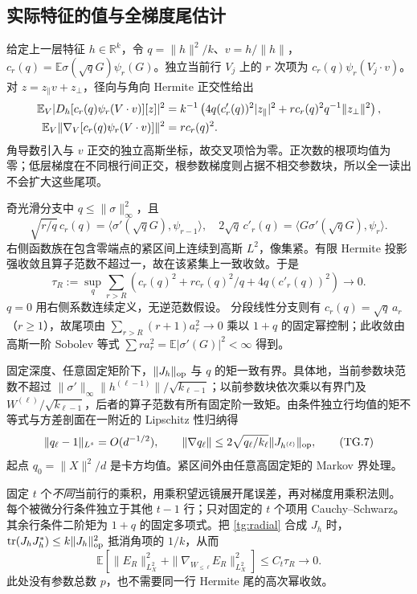 \documentclass[a4paper]{tufte-handout}
\begin{document}
\begin{fullwidth}
\subsection{实际特征的值与全梯度尾估计}
给定上一层特征 $h\in\mathbb R^k$，令 $q=\|h\|^2/k$、$v=h/\|h\|$，
$c_r(q)=\mathbb E\sigma(\sqrt qG)\psi_r(G)$。独立当前行 $V_j$ 上的 $r$ 次项为 $c_r(q)\psi_r(V_j\cdot v)$。对 $z=z_\parallel v+z_\perp$，径向与角向 Hermite 正交性给出
\begin{align}
 \mathbb E_V|D_h[c_r(q)\psi_r(V\cdot v)][z]|^2
 &=k^{-1}\left(4q(c'_r(q))^2|z_\parallel|^2+
              r c_r(q)^2q^{-1}\|z_\perp\|^2\right),\label{tg:radial}\\
 \mathbb E_V\|\nabla_V[c_r(q)\psi_r(V\cdot v)]\|^2&=r c_r(q)^2.\notag
\end{align}
角导数引入与 $v$ 正交的独立高斯坐标，故交叉项恰为零。正次数的根项均值为零；低层梯度在不同根行间正交，根参数梯度则占据不相交参数块，所以全一读出不会扩大这些尾项。

奇光滑分支中 $q\le\|\sigma\|_\infty^2$，且
\[
 \sqrt{r/q}\,c_r(q)=\langle\sigma'(\sqrt qG),\psi_{r-1}\rangle,\quad
 2\sqrt q\,c'_r(q)=\langle G\sigma'(\sqrt qG),\psi_r\rangle.
\]
右侧函数族在包含零端点的紧区间上连续到高斯 $L^2$，像集紧。有限 Hermite 投影强收敛且算子范数不超过一，故在该紧集上一致收敛。于是
\[
 \tau_R:=\sup_q\sum_{r>R}\left(c_r(q)^2+r c_r(q)^2/q+4q(c'_r(q))^2\right)\longrightarrow0.
 \tag{TG.6}
\]
$q=0$ 用右侧系数连续定义，无逆范数假设。
分段线性分支则有 $c_r(q)=\sqrt q\,a_r$（$r\ge1$），故尾项由
$\sum_{r>R}(r+1)a_r^2\to0$ 乘以 $1+q$ 的固定幂控制；此收敛由高斯一阶 Sobolev 等式 $\sum r a_r^2=\mathbb E|\sigma'(G)|^2<\infty$ 得到。

固定深度、任意固定矩阶下，$\|J_h\|_{\rm op}$ 与 $q$ 的矩一致有界。具体地，当前参数块范数不超过 $\|\sigma'\|_\infty\|h^{(\ell-1)}\|/\sqrt{k_{\ell-1}}$；以前参数块依次乘以有界门及 $W^{(\ell)}/\sqrt{k_{\ell-1}}$，后者的算子范数有所有固定阶一致矩。由条件独立行均值的矩不等式与方差剖面在一附近的 Lipschitz 性归纳得
\[
 \|q_\ell-1\|_{L^s}=O(d^{-1/2}),\qquad
 \|\nabla q_\ell\|\le2\sqrt{q_\ell/k_\ell}\|J_{h^{(\ell)}}\|_{\rm op},
 \tag{TG.7}
\]
起点 $q_0=\|X\|^2/d$ 是卡方均值。紧区间外由任意高固定矩的 Markov 界处理。

固定 $t$ 个\emph{不同}当前行的乘积，用乘积望远镜展开尾误差，再对梯度用乘积法则。每个被微分行条件独立于其他 $t-1$ 行；只对固定的 $t$ 个项用 Cauchy--Schwarz。其余行条件二阶矩为 $1+q$ 的固定多项式。把 \eqref{tg:radial} 合成 $J_h$ 时，
$\operatorname{tr}(J_hJ_h^*)\le k\|J_h\|_{\rm op}^2$ 抵消角项的 $1/k$，从而
\begin{equation}\label{tg:product-tail}
 \mathbb E\left[\|E_R\|_{L_X^2}^2+
 \|\nabla_{W_{\le\ell}}E_R\|_{L_X^2}^2\right]\le C_t\tau_R\longrightarrow0.
\end{equation}
此处没有参数总数 $p$，也不需要同一行 Hermite 尾的高次幂收敛。


\end{fullwidth}
\end{document}
